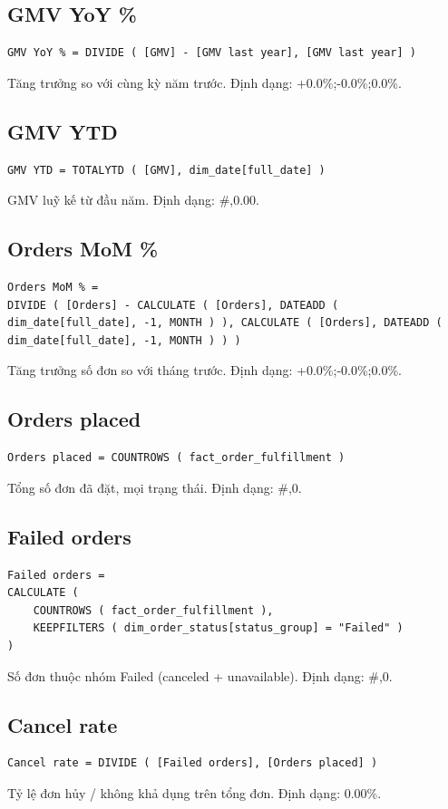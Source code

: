 \subsection*{GMV YoY \%}
\begin{lstlisting}[language={}]
GMV YoY % = DIVIDE ( [GMV] - [GMV last year], [GMV last year] )
\end{lstlisting}
Tăng trưởng so với cùng kỳ năm trước. Định dạng: +0.0\%;-0.0\%;0.0\%.

\subsection*{GMV YTD}
\begin{lstlisting}[language={}]
GMV YTD = TOTALYTD ( [GMV], dim_date[full_date] )
\end{lstlisting}
GMV luỹ kế từ đầu năm. Định dạng: \#,0.00.

\subsection*{Orders MoM \%}
\begin{lstlisting}[language={}]
Orders MoM % =
DIVIDE ( [Orders] - CALCULATE ( [Orders], DATEADD ( dim_date[full_date], -1, MONTH ) ), CALCULATE ( [Orders], DATEADD ( dim_date[full_date], -1, MONTH ) ) )
\end{lstlisting}
Tăng trưởng số đơn so với tháng trước. Định dạng: +0.0\%;-0.0\%;0.0\%.

\subsection*{Orders placed}
\begin{lstlisting}[language={}]
Orders placed = COUNTROWS ( fact_order_fulfillment )
\end{lstlisting}
Tổng số đơn đã đặt, mọi trạng thái. Định dạng: \#,0.

\subsection*{Failed orders}
\begin{lstlisting}[language={}]
Failed orders =
CALCULATE (
    COUNTROWS ( fact_order_fulfillment ),
    KEEPFILTERS ( dim_order_status[status_group] = "Failed" )
)
\end{lstlisting}
Số đơn thuộc nhóm Failed (canceled + unavailable). Định dạng: \#,0.

\subsection*{Cancel rate}
\begin{lstlisting}[language={}]
Cancel rate = DIVIDE ( [Failed orders], [Orders placed] )
\end{lstlisting}
Tỷ lệ đơn hủy / không khả dụng trên tổng đơn. Định dạng: 0.00\%.

